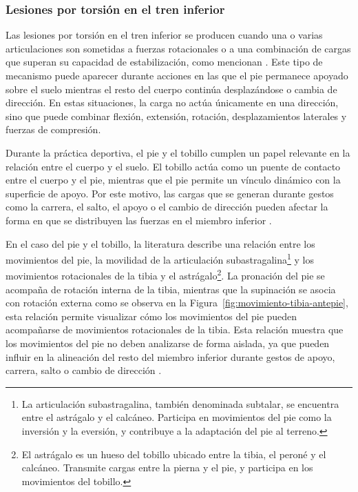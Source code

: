 


\subsubsection{Lesiones por torsión en el tren inferior}

Las lesiones por torsión en el tren inferior se producen cuando una o varias articulaciones son
sometidas a fuerzas rotacionales o a una combinación de cargas que superan su capacidad de
estabilización, como mencionan \textcite{ShimokochiShultz2008}. Este tipo de mecanismo puede
aparecer durante acciones en las que el pie permanece apoyado sobre el suelo mientras el resto
del cuerpo continúa desplazándose o cambia de dirección. En estas situaciones, la carga no
actúa únicamente en una dirección, sino que puede combinar flexión, extensión, rotación,
desplazamientos laterales y fuerzas de compresión.

Durante la práctica deportiva, el pie y el tobillo cumplen un papel relevante en la relación
entre el cuerpo y el suelo. El tobillo actúa como un puente de contacto entre el cuerpo y el
pie, mientras que el pie permite un vínculo dinámico con la superficie de apoyo. Por este
motivo, las cargas que se generan durante gestos como la carrera, el salto, el apoyo o el cambio
de dirección pueden afectar la forma en que se distribuyen las fuerzas en el miembro inferior
\parencite{SanchezHernandezEtAl2016}.

En el caso del pie y el tobillo, la literatura describe una relación entre los movimientos del
pie, la movilidad de la articulación subastragalina\footnote{La articulación subastragalina,
también denominada subtalar, se encuentra entre el astrágalo y el calcáneo. Participa en
movimientos del pie como la inversión y la eversión, y contribuye a la adaptación del pie al
terreno.} y los movimientos rotacionales de la tibia y el astrágalo\footnote{El astrágalo es un
hueso del tobillo ubicado entre la tibia, el peroné y el calcáneo. Transmite cargas entre la
pierna y el pie, y participa en los movimientos del tobillo.}. La pronación del pie se acompaña
de rotación interna de la tibia, mientras que la supinación se asocia con rotación externa como
se observa en la Figura~\ref{fig:movimiento-tibia-antepie}, esta relación permite visualizar
cómo los movimientos del pie pueden acompañarse de movimientos rotacionales de la tibia. Esta
relación muestra que los movimientos del pie no deben analizarse de forma aislada, ya que pueden
influir en la alineación del resto del miembro inferior durante gestos de apoyo, carrera, salto
o cambio de dirección \parencite{SanchezHernandezEtAl2016}.

